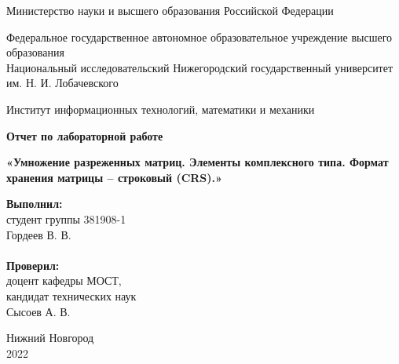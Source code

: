 \documentclass{report}
\begin{document}
\begin{titlepage}

\begin{center}
Министерство науки и высшего образования Российской Федерации
\end{center}

\begin{center}
Федеральное государственное автономное образовательное учреждение высшего образования \\
Национальный исследовательский Нижегородский государственный университет им. Н. И. Лобачевского
\end{center}

\begin{center}
Институт информационных технологий, математики и механики
\end{center}

\vspace{4em}

\begin{center}
\textbf{\Large Отчет по лабораторной работе} \\
\end{center}
\begin{center}
\textbf{\Large «Умножение разреженных матриц. Элементы комплексного типа. Формат хранения матрицы – строковый (CRS).»} \\
\end{center}

\vspace{4em}

\newbox{\lbox}
\newlength{\maxl}
\setlength{\maxl}{\wd\lbox}
\hfill\parbox{7cm}{
\hspace*{5cm}\hspace*{-5cm}\textbf{Выполнил:} \\ студент группы 381908-1 \\ Гордеев В. В.\\
\\
\hspace*{5cm}\hspace*{-5cm}\textbf{Проверил:}\\ доцент кафедры МОСТ, \\ кандидат технических наук \\ Сысоев А. В.\\
}
\vspace{\fill}

\begin{center} Нижний Новгород \\ 2022 \end{center}

\end{titlepage}
\end{document}
